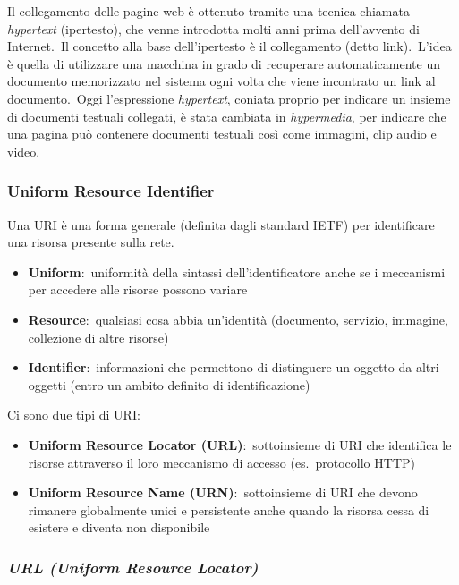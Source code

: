Il collegamento delle pagine web è ottenuto tramite una tecnica chiamata \emph{hypertext} (ipertesto), che venne introdotta molti anni prima dell'avvento di Internet.\
Il concetto alla base dell'ipertesto è il collegamento (detto link).\
L'idea è quella di utilizzare una macchina in grado di recuperare automaticamente un documento memorizzato nel sistema ogni volta che viene incontrato un link al documento.\
Oggi l'espressione \emph{hypertext}, coniata proprio per indicare un insieme di documenti testuali collegati, è stata cambiata in \emph{hypermedia}, per indicare che una pagina può contenere documenti testuali così come immagini, clip audio e video.

\subsubsection{Uniform Resource Identifier}

Una URI è una forma generale (definita dagli standard IETF) per identificare una risorsa presente sulla rete.
\begin{itemize}
    \item \textbf{Uniform}:\ uniformità della sintassi dell'identificatore anche se i meccanismi per accedere alle risorse possono variare
    \item \textbf{Resource}:\ qualsiasi cosa abbia un'identità (documento, servizio, immagine, collezione di altre risorse)
    \item \textbf{Identifier}:\ informazioni che permettono di distinguere un oggetto da altri oggetti (entro un ambito definito di identificazione)
\end{itemize}
Ci sono due tipi di URI:
\begin{itemize}
    \item \textbf{Uniform Resource Locator (URL)}:\ sottoinsieme di URI che identifica le risorse attraverso il loro meccanismo di accesso (es.\ protocollo HTTP)
    \item \textbf{Uniform Resource Name (URN)}:\ sottoinsieme di URI che devono rimanere globalmente unici e persistente anche quando la risorsa cessa di esistere e diventa non disponibile
\end{itemize}

\subsubsection{\emph{URL (Uniform Resource Locator)}}

